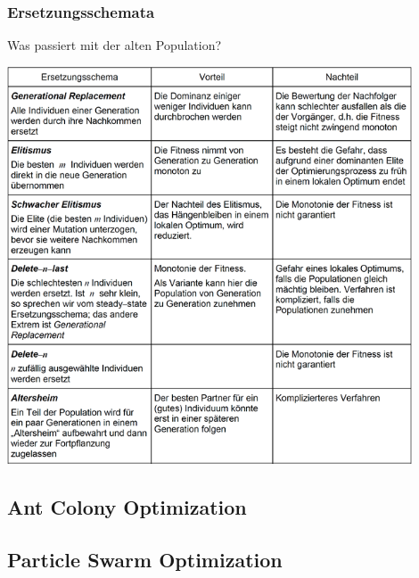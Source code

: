  \subsubsection{Ersetzungsschemata }
   Was passiert mit der alten Population? 
   
   \includegraphics[width=12cm]{./Content/MetaHeuristics/GeneticAlgorithms_Replacements}
   
   
 \subsection{Ant Colony Optimization }
 
 \subsection{Particle Swarm Optimization }
 
 